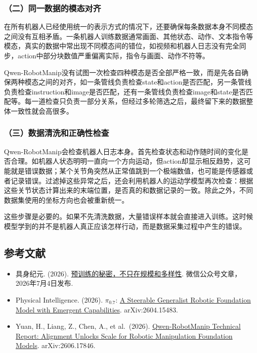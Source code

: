 \hypertarget{ux4e8cux540cux4e00ux6570ux636eux7684ux6a21ux6001ux5bf9ux9f50}{%
\subsubsection{（二）同一数据的模态对齐}\label{ux4e8cux540cux4e00ux6570ux636eux7684ux6a21ux6001ux5bf9ux9f50}}

在所有机器人已经使用统一的表示方式的情况下，还要确保每条数据本身不同模态之间没有互相矛盾。一条机器人训练数据通常画面、其他状态、动作、文本指令等模态，真实的数据中常出现不同模态间的错位，如视频和机器人日志没有完全同步，action中部分块数值严重偏离实际，指令与画面、动作不符等。

Qwen-RobotManip没有试图一次检查四种模态是否全部严格一致，而是先各自确保两种模态之间的对齐，如一条管线负责检查state和action是否匹配，另一条管线负责检查instruction和image是否匹配，还有一条管线负责检查image和state是否匹配等。每一道检查只负责一部分关系，但经过多轮筛选之后，最终留下来的数据整体一致性就会高很多。

\hypertarget{ux4e09ux6570ux636eux6e05ux6d17ux548cux6b63ux786eux6027ux68c0ux67e5}{%
\subsubsection{（三）数据清洗和正确性检查}\label{ux4e09ux6570ux636eux6e05ux6d17ux548cux6b63ux786eux6027ux68c0ux67e5}}

Qwen-RobotManip会检查机器人日志本身。首先检查状态和动作随时间的变化是否合理。如机器人状态明明一直向一个方向运动，但action却显示相反趋势，这可能就是错误数据；某个关节角突然从正常值跳到一个极端数值，也可能是传感器或者记录错误。过滤掉这些异常之后，还会利用机器人的运动学模型再次检查：根据这些关节状态计算出来的末端位置，是否真的和数据记录的一致。除此之外，不同数据集使用的坐标方向也会被重新统一。

这些步骤是必要的。如果不先清洗数据，大量错误样本就会直接进入训练。这时候模型学到的并不是机器人真正应该怎样行动，而是数据采集过程中产生的错误。

\FloatBarrier
{}
\hypertarget{ux53c2ux8003ux6587ux732e-165}{%
\subsection{参考文献}\label{ux53c2ux8003ux6587ux732e-165}}

\vspace{0.25em}
\begin{itemize}
\tightlist
\item
  具身纪元. (2026). \href{https://www.jintiankansha.com/t/8QXVctCOWG}{预训练的秘密，不只在规模和多样性}. 微信公众号文章，2026年7月4日发布.
\item
  Physical Intelligence. (2026). \(\pi_{0.7}\): \href{https://arxiv.org/abs/2604.15483}{A Steerable Generalist Robotic Foundation Model with Emergent Capabilities}. arXiv:2604.15483.
\item
  Yuan, H., Liang, Z., Chen, A., et al.~(2026). \href{https://arxiv.org/abs/2606.17846}{Qwen-RobotManip Technical Report: Alignment Unlocks Scale for Robotic Manipulation Foundation Models}. arXiv:2606.17846.
\end{itemize}

\clearpage
